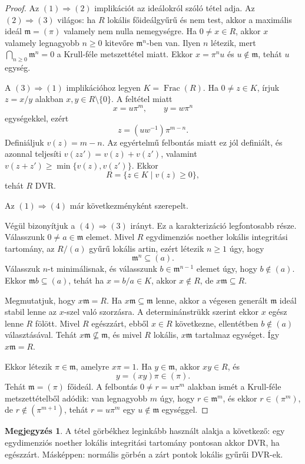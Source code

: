 \documentclass[11pt,a4paper]{article}
\theoremstyle{definition}
\newtheorem{megjegyzes}[tetel]{Megjegyzés}
\DeclareMathOperator{\Frac}{Frac}
\newcommand{\mm}{\mathfrak m}
\begin{document}
\begin{proof}
Az $(1)\Rightarrow(2)$ implikációt az ideálokról szóló tétel adja.
Az $(2)\Rightarrow(3)$ világos: ha $R$ lokális főideálgyűrű és nem
test, akkor a maximális ideál $\mm=(\pi)$ valamely nem nulla
nemegységre. Ha $0\neq x\in R$, akkor $x$ valamely legnagyobb
$n\geq 0$ kitevőre $\mm^n$-ben van. Ilyen $n$ létezik, mert
$\bigcap_{n\geq 0}\mm^n=0$ a Krull-féle metszettétel miatt. Ekkor
$x=\pi^n u$ és $u\notin\mm$, tehát $u$ egység.

A $(3)\Rightarrow(1)$ implikációhoz legyen $K=\Frac(R)$. Ha
$0\neq z\in K$, írjuk $z=x/y$ alakban $x,y\in R\setminus\{0\}$. A
feltétel miatt
\[
  x=u\pi^m,\qquad y=w\pi^n
\]
egységekkel, ezért
\[
  z=(uw^{-1})\pi^{m-n}.
\]
Definiáljuk $v(z)=m-n$. Az egyértelmű felbontás miatt ez jól
definiált, és azonnal teljesíti
$v(zz')=v(z)+v(z')$, valamint
$v(z+z')\geq\min\{v(z),v(z')\}$. Ekkor
\[
  R=\{z\in K\mid v(z)\geq 0\},
\]
tehát $R$ DVR.

Az $(1)\Rightarrow(4)$ már következményként szerepelt.

Végül bizonyítjuk a $(4)\Rightarrow(3)$ irányt. Ez a karakterizáció
legfontosabb része. Válasszunk $0\neq a\in\mm$ elemet. Mivel
$R$ egydimenziós noether lokális integritási tartomány, az $R/(a)$ gyűrű
lokális artin, ezért létezik $n\geq 1$ úgy, hogy
\[
  \mm^n\subseteq (a).
\]
Válasszuk $n$-t minimálisnak, és válasszunk
$b\in\mm^{n-1}$ elemet úgy, hogy $b\notin(a)$. Ekkor
$\mm b\subseteq(a)$, tehát ha $x=b/a\in K$, akkor $x\notin R$, de
$x\mm\subseteq R$.

Megmutatjuk, hogy $x\mm=R$. Ha $x\mm\subseteq\mm$ lenne, akkor a
végesen generált $\mm$ ideál stabil lenne az $x$-szel való szorzásra.
A determinánstrükk szerint ekkor $x$ egész lenne $R$ fölött.
Mivel $R$ egészzárt, ebből $x\in R$ következne, ellentétben
$b\notin(a)$ választásával. Tehát $x\mm\nsubseteq\mm$, és mivel $R$
lokális, $x\mm$ tartalmaz egységet. Így $x\mm=R$.

Ekkor létezik $\pi\in\mm$, amelyre $x\pi=1$. Ha $y\in\mm$, akkor
$xy\in R$, és
\[
  y=(xy)\pi\in(\pi).
\]
Tehát $\mm=(\pi)$ főideál. A felbontás
$0\neq r=u\pi^m$ alakban ismét a Krull-féle metszettételből adódik:
van legnagyobb $m$ úgy, hogy $r\in\mm^m$, és ekkor
$r\in(\pi^m)$, de $r\notin(\pi^{m+1})$, tehát $r=u\pi^m$ egy
$u\notin\mm$ egységgel.
\end{proof}

\begin{megjegyzes}
A tétel görbékhez leginkább használt alakja a következő: egy
egydimenziós noether lokális integritási tartomány pontosan akkor DVR, ha
egészzárt. Másképpen: normális görbén a zárt pontok lokális
gyűrűi DVR-ek.
\end{megjegyzes}
\end{document}
